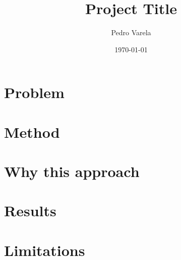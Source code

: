 \documentclass[11pt]{article}
\title{Project Title}
\author{Pedro Varela}
\date{\today}
\begin{document}
\maketitle

\begin{abstract}
\end{abstract}

\section{Problem}

\section{Method}

\section{Why this approach}

\section{Results}

\section{Limitations}



\end{document}
